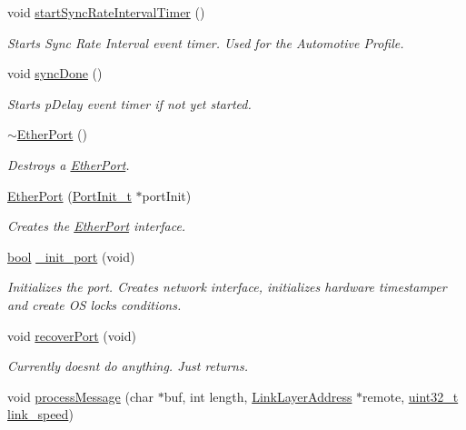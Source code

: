 \begin{DoxyCompactItemize}
void \hyperlink{class_ether_port_a7ae21f1deada9524bcc5854ef5729ec1}{start\+Sync\+Rate\+Interval\+Timer} ()
\begin{DoxyCompactList}\small\item\em Starts Sync Rate Interval event timer. Used for the Automotive Profile. \end{DoxyCompactList}\item 
void \hyperlink{class_ether_port_a802e021799f3f84c0bb06523a58f133b}{sync\+Done} ()
\begin{DoxyCompactList}\small\item\em Starts p\+Delay event timer if not yet started. \end{DoxyCompactList}\item 
\hyperlink{class_ether_port_a9871314b46ce52a468743d1dd8b1d09b}{$\sim$\+Ether\+Port} ()
\begin{DoxyCompactList}\small\item\em Destroys a \hyperlink{class_ether_port}{Ether\+Port}. \end{DoxyCompactList}\item 
\hyperlink{class_ether_port_acebae3719a05786d237ee8b82329b664}{Ether\+Port} (\hyperlink{struct_port_init__t}{Port\+Init\+\_\+t} $\ast$port\+Init)
\begin{DoxyCompactList}\small\item\em Creates the \hyperlink{class_ether_port}{Ether\+Port} interface. \end{DoxyCompactList}\item 
\hyperlink{avb__gptp_8h_af6a258d8f3ee5206d682d799316314b1}{bool} \hyperlink{class_ether_port_a710efb6671511196439987e463499508}{\+\_\+init\+\_\+port} (void)
\begin{DoxyCompactList}\small\item\em Initializes the port. Creates network interface, initializes hardware timestamper and create OS locks conditions. \end{DoxyCompactList}\item 
void \hyperlink{class_ether_port_adbdec0aadf109d5cff2279304ad73cd1}{recover\+Port} (void)
\begin{DoxyCompactList}\small\item\em Currently doesnt do anything. Just returns. \end{DoxyCompactList}\item 
void \hyperlink{class_ether_port_a3a562fa917715c602f5b750f8d2bdc81}{process\+Message} (char $\ast$buf, int length, \hyperlink{class_link_layer_address}{Link\+Layer\+Address} $\ast$remote, \hyperlink{parse_8c_a6eb1e68cc391dd753bc8ce896dbb8315}{uint32\+\_\+t} \hyperlink{class_common_port_aae24fc4f200e75aa8215f797b2561dbf}{link\+\_\+speed})

\end{DoxyCompactItemize}
